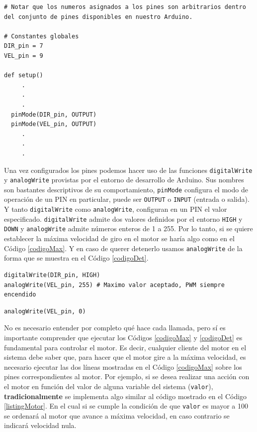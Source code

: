 \begin{lstlisting}[caption=Configuración inicial del control del motor DC.,label={listing1}]
# Notar que los numeros asignados a los pines son arbitrarios dentro del conjunto de pines disponibles en nuestro Arduino.

# Constantes globales
DIR_pin = 7
VEL_pin = 9

def setup()
     .
     .
     .
  pinMode(DIR_pin, OUTPUT)
  pinMode(VEL_pin, OUTPUT)
     .
     .
     .
\end{lstlisting}


Una vez configurados los pines podemos hacer uso de las funciones \verb|digitalWrite| y \verb|analogWrite| provistas por el entorno de desarrollo de Arduino. Sus nombres son bastantes descriptivos de su comportamiento, \verb|pinMode| configura el modo de operación de un PIN en particular, puede ser \verb|OUTPUT| o \verb|INPUT| (entrada o salida). Y tanto \verb|digitalWrite| como \verb|analogWrite|, configuran en un PIN el valor especificado. \verb|digitalWrite| admite dos valores definidos por el entorno \verb|HIGH| y \verb|DOWN| y \verb|analogWrite| admite números enteros de 1 a 255. Por lo tanto, si se quiere establecer la máxima velocidad de giro en el motor se haría algo como en el Código \ref{codigoMax}. Y en caso de querer detenerlo usamos \verb|analogWrite| de la forma que se muestra en el Código \ref{codigoDet}.

\begin{lstlisting}[caption=Establecer 
máxima velocidad giro en sentido horario.,label={codigoMax}]
digitalWrite(DIR_pin, HIGH)
analogWrite(VEL_pin, 255) # Maximo valor aceptado, PWM siempre encendido
\end{lstlisting}

\begin{lstlisting}[caption=Detener giro del motor DC., label={codigoDet}]
analogWrite(VEL_pin, 0)
\end{lstlisting}

No es necesario entender por completo qué hace cada llamada, pero sí es importante comprender que ejecutar los Códigos \ref{codigoMax} y \ref{codigoDet} es fundamental para controlar el motor. Es decir, cualquier cliente del motor en el sistema debe saber que, para hacer que el motor gire a la máxima velocidad, es necesario ejecutar las dos líneas mostradas en el Código \ref{codigoMax} sobre los pines correspondientes al motor. Por ejemplo, si se desea realizar una acción con el motor en función del valor de alguna variable del sistema (\verb|valor|), \textbf{tradicionalmente} se implementa algo similar al código mostrado en el Código \ref{listingMotor}. En el cual si se cumple la condición de que \verb|valor| es mayor a 100 se ordenará al motor que avance a máxima velocidad, en caso contrario se indicará velocidad nula.


